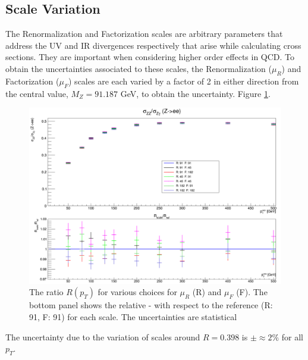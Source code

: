 \documentclass[11pt,a4paper,final]{report}
\begin{document}
\subsection{Scale Variation}
The Renormalization and Factorization scales are arbitrary parameters that address the UV and IR divergences respectively that arise while calculating cross sections. They are important when considering higher order effects in QCD. To obtain the uncertainties associated to these scales, the Renormalization ($\mu_R$) and Factorization ($\mu_F$) scales are each varied by a factor of 2 in either direction from the central value, $M_Z = 91.187$ GeV, to obtain the uncertainty. Figure \ref{fig:scalecompare}.
\begin{figure}[H]
\centering
\includegraphics[width=0.8\linewidth]{scale/nlo_scale_overlay.png}
\caption{The ratio $R(p_T)$ for various choices for $\mu_R$ (R) and $\mu_F$ (F). The bottom panel shows the relative - with respect to the reference (R: 91, F: 91) for each scale. The uncertainties are statistical}
\label{fig:scalecompare}
\end{figure}
The uncertainty due to the variation of scales around $R = 0.398$ is $\pm \approx 2\%$ for all $p_T$.
\end{document}
